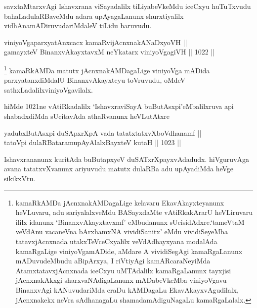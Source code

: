 \begin{artha}
savxtaMtarxvAgi Ishavxrana viSayadalilx tiLiyabeVkeMdu iceCxyu huTuTxvudu bahaLadulaRBaveMdu adara upAyagaLanunx shurxtiyalilx vidhAnamADiruvudariMdaleV tiLidu baruvudu.
\end{artha}


\begin{shl}
viniyoVgaparxyatAnxcacx kamaRvijAcnxnakANaDxyoVH || \\
gamayxteV BinanxvAkayxtavxM neYkatarx viniyoVgagiVH \hfill || 1022 ||  
\end{shl}

\begin{artha}
\footnote{kamaRkAMDa jAcnxnakAMDagaLige kelavaru EkavAkayxteyanunx heVLuvaru, adu sariyalalxveMdu BASayxdaMte vAtiRkakArarU heVLiruvaru ililx idanunx `BinanxvAkayxtavxmf' eMbudanunx sUcisidAdxre.`tameVtaM veVdAnu vacaneVna bArxhamxNA vividiSanitx' eMdu vividiSeyeMba tatavxjAcnxnada utakxTeVceCxyalilx veVdAdhayxyana modalAda kamaRgaLige viniyoVgamADide, aMdare A vividiSegAgi kamaRgaLanunx mADuvudeMbudu aBipArxya, I riVtiyAgi kamARcaraNeyiMda AtamxtatavxjAcnxnada iceCxyu uMTAdalilx kamaRgaLanunx tayxjisi jAcnxnakAkxgi sharxvaNAdigaLanunx mADabeVkeMba viniyoVgavu BinanxvAgi kANuvudariMda eraDu kAMDagaLu EkavAkayxvAgudilalx, jAcnxnakekx neVra sAdhanagaLu shamadamAdiguNagaLu kamaRgaLalalx.} kamaRkAMDa matutx jAcnxnakAMDagaLige viniyoVga mADida parxyatanxdiMdalU BinanxvAkayxteyu toVruvudu, oMdeV sathxLadalilx\break viniyoVgavilalx.
\end{artha}

\begin{artha}
hiMde 1021ne vAtiRkadalilx `IshavxraviSayA buButAsxpi'\break eMbalilxruva api shabadxdiMda sUcitavAda athaRvanunx heVLutAtxre\ndash 
\end{artha}

\begin{shl}
yadubxButAsx\s pi duSApxrXpA vada tatatxtatxvXboVdhanamf || \\
tatoV\s pi dulaRBataramupAyAlalxBayxteV kutaH \hfill || 1023 ||  
\end{shl}

\begin{artha}
Ishavxrananunx kuritAda buButapxyeV duSATxrXpayxvAdadudx. hiVguruvAga avana tatatxvXvanunx ariyuvudu matutx dulaRBa adu upAyadiMda heVge sikikxVtu.
\end{artha}

